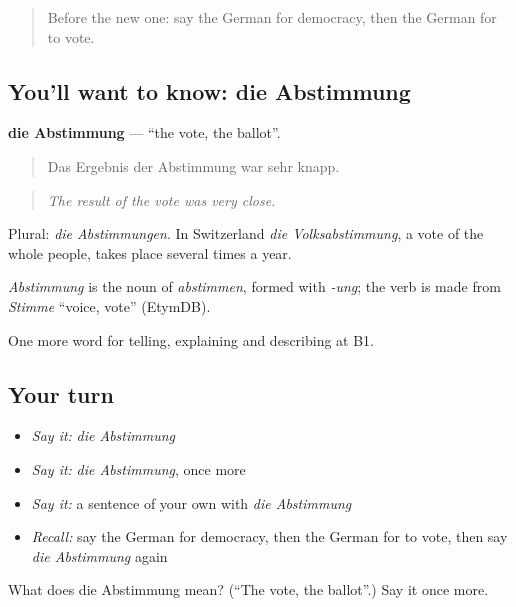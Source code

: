 \begin{quote}
Before the new one: say the German for democracy, then the German for to vote.
\end{quote}

\subsection*{You'll want to know: die Abstimmung}
\textbf{die Abstimmung} — \textquotedblleft{}the vote, the ballot\textquotedblright{}.

\begin{quote}
Das Ergebnis der Abstimmung war sehr knapp.
\end{quote}

\begin{quote}
\emph{The result of the vote was very close.}
\end{quote}

Plural: \emph{die Abstimmungen}. In Switzerland \emph{die Volksabstimmung}, a vote of the whole people, takes place several times a year.

\begin{cousinweb}
\emph{Abstimmung} is the noun of \emph{abstimmen}, formed with \emph{-ung}; the verb is made from \emph{Stimme} \textquotedblleft{}voice, vote\textquotedblright{} (EtymDB).
\end{cousinweb}

\begin{grammarlens}[title={What you've built}]
One more word for telling, explaining and describing at B1.
\end{grammarlens}

\subsection*{Your turn}
\begin{itemize}
\raggedright
  \item \emph{Say it:} \emph{die Abstimmung}
  \item \emph{Say it:} \emph{die Abstimmung}, once more
  \item \emph{Say it:} a sentence of your own with \emph{die Abstimmung}
  \item \emph{Recall:} say the German for democracy, then the German for to vote, then say \emph{die Abstimmung} again
\end{itemize}

\begin{tcolorbox}[breakable,colback=teal!4,colframe=teal!35!black,title={Before you move on}]
What does die Abstimmung mean? (\textquotedblleft{}The vote, the ballot\textquotedblright{}.) Say it once more.
\end{tcolorbox}
